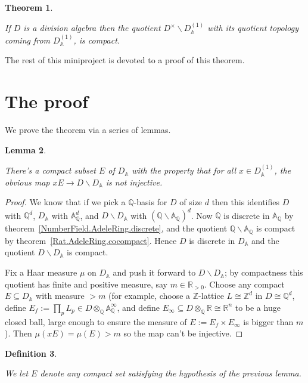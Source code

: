 \documentclass[10pt,a4paper]{article}
\newcommand{\Z}{\mathbb{Z}}
\newcommand{\A}{\mathbb{A}}
\newcommand{\Q}{\mathbb{Q}}
\newcommand{\R}{\mathbb{R}}
\newcounter{chapter}
\newtheorem{theorem}{Theorem}[chapter]
\newtheorem{lemma}[theorem]{Lemma}
\newtheorem{definition}[theorem]{Definition}
\newcommand{\uses}[1]{}
\newcommand{\lean}[1]{}
\newcommand{\leanok}{}
\begin{document}
\begin{theorem}
  \label{NumberField.AdeleRing.DivisionAlgebra.compact_quotient}
  \lean{NumberField.AdeleRing.DivisionAlgebra.compact_quotient}
  \leanok
  If $D$ is a division algebra then
  the quotient $D^\times\backslash D_{\A}^{(1)}$
  with its quotient topology coming from $D_{\A}^{(1)}$, is compact.
\end{theorem}


The rest of this miniproject is devoted to a proof of this theorem.

\section{The proof}

We prove the theorem via a series of lemmas.


\begin{lemma}
  \label{NumberField.AdeleRing.DivisionAlgebra.Aux.existsE}
  \lean{NumberField.AdeleRing.DivisionAlgebra.Aux.existsE}
  \leanok
  There's a compact subset $E$ of $D_{\A}$
  with the property that for all $x\in D_{\A}^{(1)}$,
  the obvious map $xE\to D\backslash D_{\A}$ is not injective.
\end{lemma}

\begin{proof}
  \leanok
  We know that if we pick a $\Q$-basis for $D$
  of size $d$ then this identifies $D$ with $\Q^d$,
  $D_{\A}$ with $\A_{\Q}^d$, and $D\backslash D_{\A}$ with
  $(\Q\backslash\A_{\Q})^d$. Now $\Q$ is discrete in $\A_{\Q}$
  by theorem~\ref{NumberField.AdeleRing.discrete}, and the quotient
  $\Q\backslash \A_{\Q}$ is compact by theorem~\ref{Rat.AdeleRing.cocompact}.
  Hence $D$ is discrete in $D_{\A}$
  and the quotient $D\backslash D_{\A}$ is compact.

    Fix a Haar measure $\mu$ on $D_{\A}$ and push it forward
    to $D\backslash D_{\A}$; by compactness this quotient has finite
    and positive measure, say $m\in\R_{>0}$.
    Choose any compact $E\subseteq D_{\A}$ with measure $> m$
    (for example, choose a $\Z$-lattice $L\cong\Z^d$ in $D\cong\Q^d$,
    define $E_f:=\prod_p L_p\in D\otimes_{\Q}\A_{\Q}^\infty$,
    and define $E_{\infty}\subseteq D\otimes_{\Q}\R\cong\R^n$ to be a huge closed
    ball, large enough to ensure the measure of $E:=E_f\times E_{\infty}$ is bigger than $m$).
    Then $\mu(xE)=\mu(E)>m$ so the map can't be injective.
\end{proof}

\begin{definition}
  \label{NumberField.AdeleRing.DivisionAlgebra.Aux.E}
  \lean{NumberField.AdeleRing.DivisionAlgebra.Aux.E}
  \uses{NumberField.AdeleRing.DivisionAlgebra.Aux.existsE}
  \leanok
  We let $E$ denote any compact set satisfying the hypothesis of the previous lemma.
\end{definition}
\end{document}
